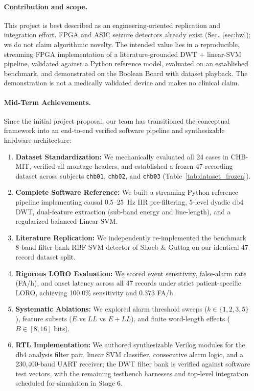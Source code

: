 \documentclass[10pt,twocolumn,letterpaper]{article}
\begin{document}
\paragraph{Contribution and scope.} This project is best described as an
engineering-oriented replication and integration effort. FPGA and ASIC
seizure detectors already exist (Sec.~\ref{sec:hw}); we do not claim
algorithmic novelty. The intended value lies in a reproducible,
streaming FPGA implementation of a literature-grounded DWT +
linear-SVM pipeline, validated against a Python reference model,
evaluated on an established benchmark, and demonstrated on the Boolean
Board with dataset playback. The demonstration is not a medically
validated device and makes no clinical claim.

{\color{blue}
\paragraph{Mid-Term Achievements.}
Since the initial project proposal, our team has transitioned the conceptual framework into an end-to-end verified software pipeline and synthesizable hardware architecture:
\begin{enumerate}
    \item \textbf{Dataset Standardization:} We mechanically evaluated all 24 cases in CHB-MIT, verified all montage headers, and established a frozen 47-recording dataset across subjects \texttt{chb01}, \texttt{chb02}, and \texttt{chb03} (Table~\ref{tab:dataset_frozen}).
    \item \textbf{Complete Software Reference:} We built a streaming Python reference pipeline implementing causal 0.5--25~Hz IIR pre-filtering, 5-level dyadic db4 DWT, dual-feature extraction (sub-band energy and line-length), and a regularized balanced Linear SVM.
    \item \textbf{Literature Replication:} We independently re-implemented the benchmark 8-band filter bank RBF-SVM detector of Shoeb \& Guttag \cite{shoeb2010icml} on our identical 47-record dataset split.
    \item \textbf{Rigorous LORO Evaluation:} We scored event sensitivity, false-alarm rate (FA/h), and onset latency across all 47 records under strict patient-specific LORO, achieving 100.0\% sensitivity and 0.373 FA/h.
    \item \textbf{Systematic Ablations:} We explored alarm threshold sweeps ($k \in \{1, 2, 3, 5\}$), feature subsets ($E$ vs $LL$ vs $E+LL$), and finite word-length effects ($B \in [8, 16]$ bits).
    \item \textbf{RTL Implementation:} We authored synthesizable Verilog modules for the db4 analysis filter pair, linear SVM classifier, consecutive alarm logic, and a 230,400-baud UART receiver; the DWT filter bank is verified against software test vectors, with the remaining testbench harnesses and top-level integration scheduled for simulation in Stage 6.
\end{enumerate}
}
\end{document}
